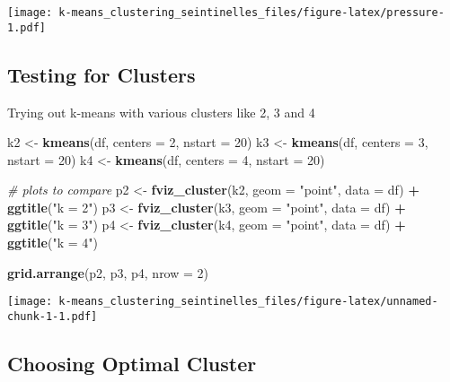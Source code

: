\documentclass[
]{article}
\newenvironment{Shaded}{\begin{snugshade}}{\end{snugshade}}
\newcommand{\AttributeTok}[1]{\textcolor[rgb]{0.13,0.29,0.53}{#1}}
\newcommand{\CommentTok}[1]{\textcolor[rgb]{0.56,0.35,0.01}{\textit{#1}}}
\newcommand{\DecValTok}[1]{\textcolor[rgb]{0.00,0.00,0.81}{#1}}
\newcommand{\FunctionTok}[1]{\textcolor[rgb]{0.13,0.29,0.53}{\textbf{#1}}}
\newcommand{\NormalTok}[1]{#1}
\newcommand{\OtherTok}[1]{\textcolor[rgb]{0.56,0.35,0.01}{#1}}
\newcommand{\SpecialCharTok}[1]{\textcolor[rgb]{0.81,0.36,0.00}{\textbf{#1}}}
\newcommand{\StringTok}[1]{\textcolor[rgb]{0.31,0.60,0.02}{#1}}
\begin{document}
\texttt{[image: k-means\_clustering\_seintinelles\_files/figure-latex/pressure-1.pdf]}

\hypertarget{testing-for-clusters}{%
\subsection{Testing for Clusters}\label{testing-for-clusters}}

Trying out k-means with various clusters like 2, 3 and 4

\begin{Shaded}
\begin{Highlighting}[]
\NormalTok{k2 }\OtherTok{\textless{}{-}} \FunctionTok{kmeans}\NormalTok{(df, }\AttributeTok{centers =} \DecValTok{2}\NormalTok{, }\AttributeTok{nstart =} \DecValTok{20}\NormalTok{)}
\NormalTok{k3 }\OtherTok{\textless{}{-}} \FunctionTok{kmeans}\NormalTok{(df, }\AttributeTok{centers =} \DecValTok{3}\NormalTok{, }\AttributeTok{nstart =} \DecValTok{20}\NormalTok{)}
\NormalTok{k4 }\OtherTok{\textless{}{-}} \FunctionTok{kmeans}\NormalTok{(df, }\AttributeTok{centers =} \DecValTok{4}\NormalTok{, }\AttributeTok{nstart =} \DecValTok{20}\NormalTok{)}

\CommentTok{\# plots to compare}
\NormalTok{p2 }\OtherTok{\textless{}{-}} \FunctionTok{fviz\_cluster}\NormalTok{(k2, }\AttributeTok{geom =} \StringTok{"point"}\NormalTok{, }\AttributeTok{data =}\NormalTok{ df) }\SpecialCharTok{+} \FunctionTok{ggtitle}\NormalTok{(}\StringTok{"k = 2"}\NormalTok{)}
\NormalTok{p3 }\OtherTok{\textless{}{-}} \FunctionTok{fviz\_cluster}\NormalTok{(k3, }\AttributeTok{geom =} \StringTok{"point"}\NormalTok{,  }\AttributeTok{data =}\NormalTok{ df) }\SpecialCharTok{+} \FunctionTok{ggtitle}\NormalTok{(}\StringTok{"k = 3"}\NormalTok{)}
\NormalTok{p4 }\OtherTok{\textless{}{-}} \FunctionTok{fviz\_cluster}\NormalTok{(k4, }\AttributeTok{geom =} \StringTok{"point"}\NormalTok{,  }\AttributeTok{data =}\NormalTok{ df) }\SpecialCharTok{+} \FunctionTok{ggtitle}\NormalTok{(}\StringTok{"k = 4"}\NormalTok{)}


\FunctionTok{grid.arrange}\NormalTok{(p2, p3, p4, }\AttributeTok{nrow =} \DecValTok{2}\NormalTok{)}
\end{Highlighting}
\end{Shaded}

\texttt{[image: k-means\_clustering\_seintinelles\_files/figure-latex/unnamed-chunk-1-1.pdf]}

\hypertarget{choosing-optimal-cluster}{%
\subsection{Choosing Optimal Cluster}\label{choosing-optimal-cluster}}
\end{document}

